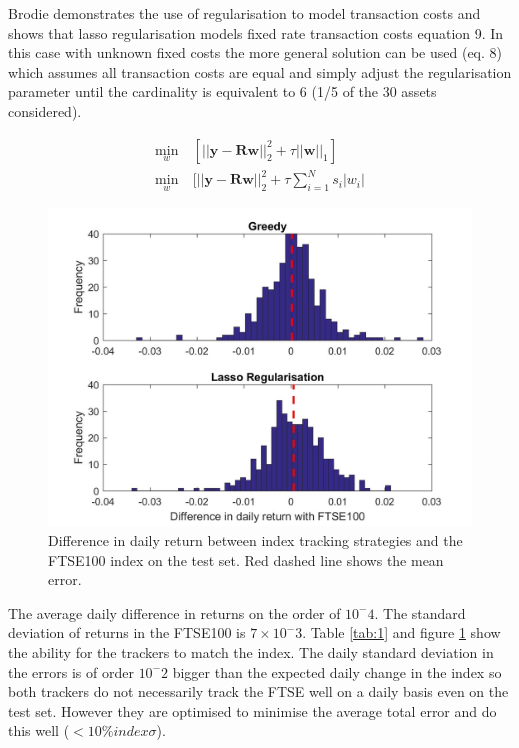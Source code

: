 \documentclass[a4paper,10pt, twocolumn]{article}
\begin{document}
Brodie \cite{Regularisation} demonstrates the use of regularisation to model transaction costs and shows that lasso regularisation models fixed rate transaction costs equation 9. In this case with unknown fixed costs the more general solution can be used (eq. 8) which assumes all transaction costs are equal and simply adjust the regularisation parameter until the cardinality is equivalent to 6 (1/5 of the 30 assets considered).

\begin{align}
\min_w \: &[||\mathbf{y - Rw}||^2_2 + \tau ||\mathbf{w}||_1] \\
\min_w \: &[||\mathbf{y - Rw}||^2_2 + \tau \sum^N_{i=1}s_i|w_i|
\end{align} 

\begin{figure}[ht]
	\includegraphics[width=\linewidth]{indexTracking.jpg}
	\centering
	\caption{Difference in daily return between index tracking strategies and the FTSE100 index on the test set. Red dashed line shows the mean error.}
			\label{fig:indexTracking}
\end{figure} 

The average daily difference in returns on the order of $10^-4$. The standard deviation of returns in the FTSE100 is $7 \times 10^-3$. Table \ref{tab:1} and figure \ref{fig:indexTracking} show the ability for the trackers to match the index. The daily standard deviation in the errors is of order $10^-2$ bigger than the expected daily change in the index so both trackers do not necessarily track the FTSE well on a daily basis even on the test set. However they are optimised to minimise the average total error and do this well ($<10\% index \sigma$). 
\end{document}
